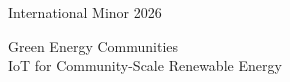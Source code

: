 \begin{frame}
    \centering
    \vfill
    {\color{fh-ooe-red}\Huge International Minor 2026\par}
    \vspace{1em}
    {\color{fh-ooe-red}\Large Green Energy Communities\\IoT for Community-Scale Renewable Energy\par}
    \vfill
\end{frame}
